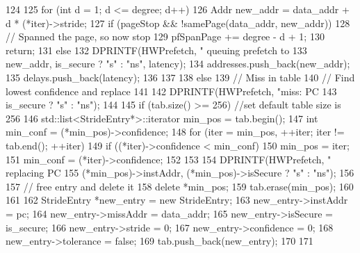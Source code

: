 \begin{DoxyCode}
{{124 
125         for (int d = 1; d <= degree; d++) {
126             Addr new_addr = data_addr + d * (*iter)->stride;
127             if (pageStop && !samePage(data_addr, new_addr)) {
128                 // Spanned the page, so now stop
129                 pfSpanPage += degree - d + 1;
130                 return;
131             } else {
132                 DPRINTF(HWPrefetch, "  queuing prefetch to %
133                         new_addr, is_secure ? "s" : "ns", latency);
134                 addresses.push_back(new_addr);
135                 delays.push_back(latency);
136             }
137         }
138     } else {
139         // Miss in table
140         // Find lowest confidence and replace
141 
142         DPRINTF(HWPrefetch, "miss: PC %
143                 is_secure ? "s" : "ns");
144 
145         if (tab.size() >= 256) { //set default table size is 256
146             std::list<StrideEntry*>::iterator min_pos = tab.begin();
147             int min_conf = (*min_pos)->confidence;
148             for (iter = min_pos, ++iter; iter != tab.end(); ++iter) {
149                 if ((*iter)->confidence < min_conf){
150                     min_pos = iter;
151                     min_conf = (*iter)->confidence;
152                 }
153             }
154             DPRINTF(HWPrefetch, "  replacing PC %
155                     (*min_pos)->instAddr, (*min_pos)->isSecure ? "s" : "ns");
156 
157             // free entry and delete it
158             delete *min_pos;
159             tab.erase(min_pos);
160         }
161 
162         StrideEntry *new_entry = new StrideEntry;
163         new_entry->instAddr = pc;
164         new_entry->missAddr = data_addr;
165         new_entry->isSecure = is_secure;
166         new_entry->stride = 0;
167         new_entry->confidence = 0;
168         new_entry->tolerance = false;
169         tab.push_back(new_entry);
170     }
171 }
\end{DoxyCode}


